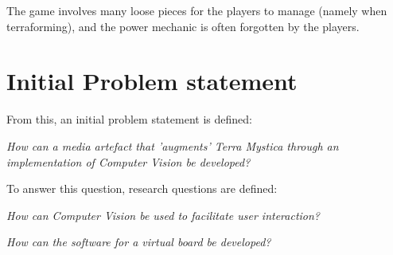 The game involves many loose pieces for the players to manage (namely when terraforming), and the power mechanic is often forgotten by the players. 

\section{Initial Problem statement}
From this, an initial problem statement is defined: 

\textit{How can a media artefact that 'augments' Terra Mystica through an implementation of Computer Vision be developed?}

To answer this question, research questions are defined:

\textit{How can Computer Vision be used to facilitate user interaction?}

\textit{How can the software for a virtual board be developed?}

